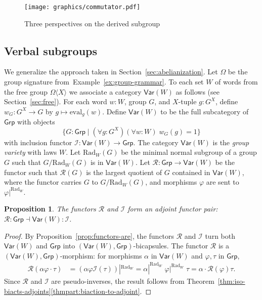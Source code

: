 \documentclass{amsart}
\newcommand{\tin}{:}
\newcommand{\Cat}[1]{\mathsf{#1}}
\newcommand{\cat}[1]{\Cat{#1}}
\newcommand{\acat}[1]{\mathsf{#1}}
\numberwithin{lstfloat}{section}
\newcommand{\func}[1]{\mathcal{#1}}
\newtheorem{prop}[thm]{Proposition}
\theoremstyle{definition}
\theoremstyle{remark}
\numberwithin{equation}{section}
\begin{document}
\begin{figure}[h]
  \centering
  \texttt{[image: graphics/commutator.pdf]}
  \caption{Three perspectives on the derived subgroup}
  \label{fig:comm}
\end{figure}


\subsection{Verbal subgroups}
\label{sec:lower-central}

We generalize the approach taken in Section~\ref{sec:abelianization}. Let $\Omega$ be
the group signature from~Example~\ref{ex:group-grammar}. To each set $W$ of words from
the free group $\Omega\langle X\rangle$ we associate a category $\acat{Var}(W)$ as follows (see Section~\ref{sec:free}). 
For each word $w :W$, group
$G$, and $X$-tuple $g\tin G^X$, define $w_G : G^X \to G$ by $g\mapsto \mathrm{eval}_g(w)$. 
Define $\acat{Var}(W)$ to be the full subcategory of $\cat{Grp}$
with objects 
\[
  \{ G:\cat{Grp} \mid (\forall g\tin G^X) (\forall w\tin W)\; w_G(g)=1\}
\]
with inclusion functor $\func{I}:\acat{Var}(W)\to \cat{Grp}$. The category
$\acat{Var}(W)$ is the \textit{group variety} with laws $W$. Let $\mathrm{Rad}_W(G)$ be the minimal normal subgroup of a group $G$ such that $G/\mathrm{Rad}_W(G)$ is in $\mathsf{Var}(W)$. Let
$\func{R}:\cat{Grp}\to \acat{Var}(W)$ be the functor such that $\func{R}(G)$ is the
largest quotient of $G$ contained in $\acat{Var}(W)$, where the functor carries $G$ 
to $G/\mathrm{Rad}_W(G)$, and morphisms $\varphi$ are sent to $\varphi|^{\mathrm{Rad}_W}$. 

\begin{prop}\label{prop:verbal}
The functors $\func{R}$ and $\func{I}$ form an adjoint functor pair: 
  $\func{R} : \acat{Grp}\dashv \acat{Var}(W) : \func{I}$.
\end{prop}

\begin{proof}
  By Proposition~\ref{prop:functors-are}, the functors $\func{R}$ and $\func{I}$ turn both
  $\acat{Var}(W)$ and $\acat{Grp}$ into $(\acat{Var}(W),\acat{Grp})$-bicapsules. The
  functor $\func{R}$ is a $(\acat{Var}(W),\acat{Grp})$-morphism: for morphisms
  $\alpha$ in $\acat{Var}(W)$ and $\varphi,\tau$ in $\acat{Grp}$, 
  \begin{align*}
    \func{R}(\alpha\varphi\cdot\tau) &= (\alpha\varphi\func{I}(\tau))|^{\mathrm{Rad}_W} = \alpha|^{\mathrm{Rad}_W}\; \varphi|^{\mathrm{Rad}_W}\; \tau = \alpha\cdot \func{R}(\varphi)\tau.
  \end{align*}
  Since $\func{R}$ and $\func{I}$ are pseudo-inverses,
  the result follows from Theorem~\ref{thm:iso-biacts-adjoints}\ref{thmpart:biaction-to-adjoint}. 
\end{proof}
\end{document}
